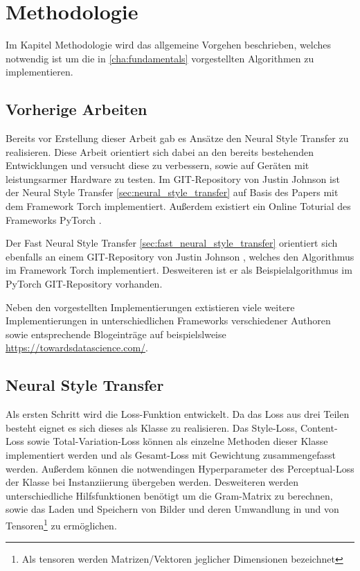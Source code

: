 \chapter{Methodologie}
\label{cha:methodology}

Im Kapitel Methodologie wird das allgemeine Vorgehen beschrieben, welches notwendig ist um die in \ref{cha:fundamentals} vorgestellten Algorithmen zu implementieren.

\section{Vorherige Arbeiten}

Bereits vor Erstellung dieser Arbeit gab es Ansätze den Neural Style Transfer zu realisieren. Diese Arbeit orientiert sich dabei an den bereits bestehenden Entwicklungen und versucht diese zu verbessern, sowie auf Geräten mit leistungsarmer Hardware zu testen. Im GIT-Repository von Justin Johnson \cite{Johnson2015} ist der Neural Style Transfer \ref{sec:neural_style_transfer} auf Basis des Papers \cite{DBLP:journals/corr/GatysEB15a} mit dem Framework Torch \cite{torch} implementiert. Außerdem existiert ein Online Toturial des Frameworks PyTorch \cite{OnlineToturialNeuralStylePyTorch}.

Der Fast Neural Style Transfer \ref{sec:fast_neural_style_transfer} orientiert sich ebenfalls an einem GIT-Repository von Justin Johnson \cite{Johnson2016}, welches den Algorithmus im Framework Torch implementiert. Desweiteren ist er als Beispielalgorithmus im PyTorch GIT-Repository \cite{PyTorchFastNeuralStyle} vorhanden.

Neben den vorgestellten Implementierungen extistieren viele weitere Implementierungen in unterschiedlichen Frameworks verschiedener Authoren sowie entsprechende Blogeinträge auf beispielslweise \url{https://towardsdatascience.com/}.

\pagebreak

\section{Neural Style Transfer}
\label{sec:method_neural_style_transfer}

Als ersten Schritt wird die Loss-Funktion entwickelt. Da das Loss aus drei Teilen besteht eignet es sich dieses als Klasse zu realisieren. Das Style-Loss, Content-Loss sowie Total-Variation-Loss können als einzelne Methoden dieser Klasse implementiert werden und als Gesamt-Loss mit Gewichtung zusammengefasst werden. Außerdem können die notwendingen Hyperparameter des Perceptual-Loss der Klasse bei Instanziierung übergeben werden. Desweiteren werden unterschiedliche Hilfsfunktionen benötigt um die Gram-Matrix zu berechnen, sowie das Laden und Speichern von Bilder und deren Umwandlung in und von Tensoren\footnote{Als \gls{tensor}en werden Matrizen/Vektoren jeglicher Dimensionen bezeichnet} zu ermöglichen.

